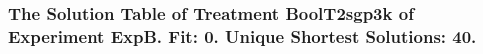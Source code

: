  \begin{frame}
 \fontsize{8pt}{9pt}\selectfont
 \frametitle{ The Solution Table of Treatment BoolT2sgp3k of Experiment ExpB. Fit: 0. Unique Shortest Solutions: 40. }

 \label{ExpBSolutionTable011.tex}  
 \end{frame}

